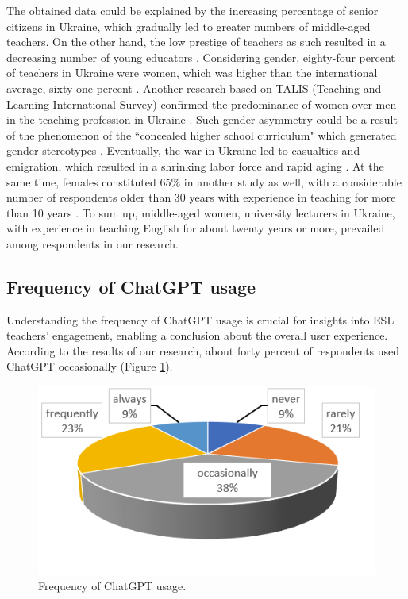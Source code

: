 \documentclass[english]{textolivre}
\begin{document}
The obtained data could be explained by the increasing percentage of senior citizens in Ukraine, which gradually led to greater numbers of middle-aged teachers. On the other hand, the low prestige of teachers as such resulted in a decreasing number of young educators \cite[p. 5]{ivanishchenko2020}. Considering gender, eighty-four percent of teachers in Ukraine were women, which was higher than the international average, sixty-one percent \cite{lisova2018}. Another research based on TALIS (Teaching and Learning International Survey) confirmed the predominance of women over men in the teaching profession in Ukraine \cite[p. 10]{ivanishchenko2020}. Such gender asymmetry could be a result of the phenomenon of the ``concealed higher school curriculum" which generated gender stereotypes \cite[p. 662]{petruchenia2014}. Eventually, the war in Ukraine led to casualties and emigration, which resulted in a shrinking labor force and rapid aging \cite[p. 245]{perelli-harris2023}. At the same time, females constituted 65\% in another study as well, with a considerable number of respondents older than 30 years with experience in teaching for more than 10 years \cite[p. 14]{nguyen2023}. To sum up, middle-aged women, university lecturers in Ukraine, with experience in teaching English for about twenty years or more, prevailed among respondents in our research.

\subsection{Frequency of ChatGPT usage}
Understanding the frequency of ChatGPT usage is crucial for insights into ESL teachers’ engagement, enabling a conclusion about the overall user experience. According to the results of our research, about forty percent of respondents used ChatGPT occasionally (Figure \ref{fig-4}).

\begin{figure}[h!]
    \centering
    \begin{minipage}{0.65\linewidth}
    \includegraphics[width=\linewidth]{Imagens/Figure4.png}
    \caption{Frequency of ChatGPT usage.}
    \label{fig-4}
    \end{minipage}
\end{figure}
\end{document}
